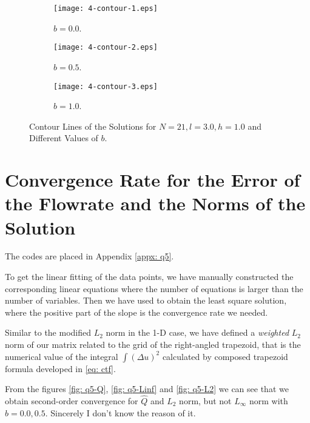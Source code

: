 \documentclass{assignment}[2019/10/15]
\begin{document}
    \begin{figure}[htb]
        \begin{subfigure}[b]{0.32\textwidth}
            \centering
            \texttt{[image: 4-contour-1.eps]}
            \caption{$b = 0.0$.}
        \end{subfigure}
        \hfill
        \begin{subfigure}[b]{0.32\textwidth}
            \centering
            \texttt{[image: 4-contour-2.eps]}
            \caption{$b = 0.5$.}
        \end{subfigure}
        \hfill
        \begin{subfigure}[b]{0.32\textwidth}
            \centering
            \texttt{[image: 4-contour-3.eps]}
            \caption{$b = 1.0$.}
        \end{subfigure}
        \caption{Contour Lines of the Solutions for $N = 21, l = 3.0, h = 1.0$ and Different Values of $b$.}
        \label{fig: q4}
    \end{figure}

    \section{Convergence Rate for the Error of the Flowrate and the Norms of the Solution}

    The codes are placed in Appendix \ref{appx: q5}.

    To get the linear fitting of the data points, we have manually constructed the corresponding linear equations where the number of equations is larger than the number of variables. Then we have used \matlabinline{\\} to obtain the least square solution, where the positive part of the slope is the convergence rate we needed.

    Similar to the modified $L_2$ norm in the 1-D case, we have defined a {\it weighted} $L_2$ norm of our matrix related to the grid of the right-angled trapezoid, that is the numerical value of the integral $\int (\Delta u)^2$ calculated by composed trapezoid formula developed in \ref{eq: ctf}.

    From the figures \ref{fig: q5-Q}, \ref{fig: q5-Linf} and \ref{fig: q5-L2} we can see that we obtain second-order convergence for $\hat Q$ and $L_2$ norm, but not $L_\infty$ norm with $b = 0.0, 0.5$. Sincerely I don't know the reason of it.
\end{document}
